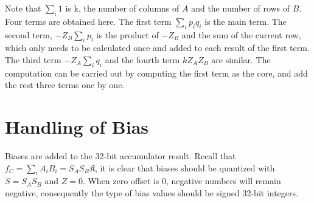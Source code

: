 Note that $\sum_{i} 1$ is k, the number of columns of $A$ and the number of rows of $B$. Four terms are
obtained here. The first term $\sum_{i} p_i q_i$ is the main term. The second term, $- Z_B \sum_{i} p_i$
is the product of $- Z_B$ and the sum of the current row, which only needs to be calculated once and added
to each result of the first term. The third term $- Z_A \sum_{i} q_i$ and the fourth term $k Z_A Z_B$ are
similar. The computation can be carried out by computing the first term as the core, and add the rest three
terms one by one.

\section{Handling of Bias}

Biases are added to the 32-bit accumulator result. Recall that $f_C = \sum_{i} A_i B_i = S_A S_B \mathfrak{K}$,
it is clear that biases should be quantized with $S = S_A S_B$ and $Z = 0$. When zero offset is $0$, negative
numbers will remain negative, consequently the type of bias values should be signed 32-bit integers.

\clearpage %
